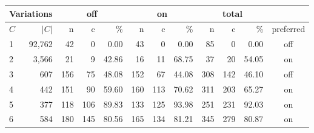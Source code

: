 \begin{tabular}{| lr |  rrr| rrr| rrr| c|}
\hline
 \multicolumn{2}{|l|}{Variations} & \multicolumn{3}{|c|}{off} & \multicolumn{3}{|c|}{on} & \multicolumn{3}{|c|}{total} & \\
\hline
 $C$ & $|C|$ & n & c & \% & n & c & \% & n & c & \% & preferred \\
\hline
1 & 92,762 & 42 & 0 & 0.00 & 43 & 0 & 0.00 & 85 & 0 & 0.00 & off \\
2 &  3,566 & 21 & 9 & 42.86 & 16 & 11 & 68.75 & 37 & 20 & 54.05 & on \\
3 &    607 & 156 & 75 & 48.08 & 152 & 67 & 44.08 & 308 & 142 & 46.10 & off \\
4 &    442 & 151 & 90 & 59.60 & 160 & 113 & 70.62 & 311 & 203 & 65.27 & on \\
5 &    377 & 118 & 106 & 89.83 & 133 & 125 & 93.98 & 251 & 231 & 92.03 & on \\
6 &    584 & 180 & 145 & 80.56 & 165 & 134 & 81.21 & 345 & 279 & 80.87 & on \\
\hline
\end{tabular}

